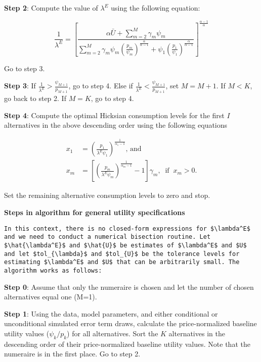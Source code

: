 \textbf{Step 2}: Compute the value of \(\lambda^E\) using the following
equation:

\begin{equation}
\frac{1}{\lambda^E} = \left[ \frac{\alpha \bar{U} + \sum_{m=2}^{M} \gamma_m \psi_m} {\sum_{m=2}^{M} \gamma_m \psi_m \left( \frac{p_m}{\psi_m} \right)^\frac{\alpha}{\alpha-1} + \psi_1 \left(\frac{p_1}{\psi_1} \right)^\frac{\alpha}{\alpha-1}} \right] ^\frac{\alpha-1}{\alpha}
\end{equation}

Go to step 3.

\textbf{Step 3}: If
\(\frac{1}{\lambda^E} > \frac{\psi_{M+1}}{p_{M+1}}\), go to step 4. Else
if \(\frac{1}{\lambda^E} < \frac{\psi_{M+1}}{p_{M+1}}\), set
\(M = M + 1\). If \(M < K\), go back to step 2. If \(M = K\), go to step
4.

\textbf{Step 4}: Compute the optimal Hicksian consumption levels for the
first \(I\) alternatives in the above descending order using the
following equations

\begin{align}
\label{eq:optimal_x}
x_1 &=   \left( \frac{p_1}{\lambda^E \psi_1} \right)^\frac{1}{\alpha_1-1}\text{, and} \\
x_m &=   \left[ \left( \frac{p_m}{\lambda^E \psi_m} \right)^\frac{1}{\alpha_m-1}-1 \right]\gamma_m, \; \; \text{if} \; \; x_m > 0.
\end{align}

Set the remaining alternative consumption levels to zero and stop.

\textbf{Steps in algorithm for general utility specifications}

\begin{verbatim}
In this context, there is no closed-form expressions for $\lambda^E$ and we need to conduct a numerical bisection routine. Let $\hat{\lambda^E}$ and $\hat{U}$ be estimates of $\lambda^E$ and $U$ and let $tol_{\lambda}$ and $tol_{U}$ be the tolerance levels for estimating $\lambda^E$ and $U$ that can be arbitrarily small. The algorithm works as follows:
\end{verbatim}

\textbf{Step 0}: Assume that only the numeraire is chosen and let the
number of chosen alternatives equal one (M=1).

\textbf{Step 1}: Using the data, model parameters, and either
conditional or unconditional simulated error term draws, calculate the
price-normalized baseline utility values (\(\psi_k/p_k\)) for all
alternatives. Sort the \(K\) alternatives in the descending order of
their price-normalized baseline utility values. Note that the numeraire
is in the first place. Go to step 2.

